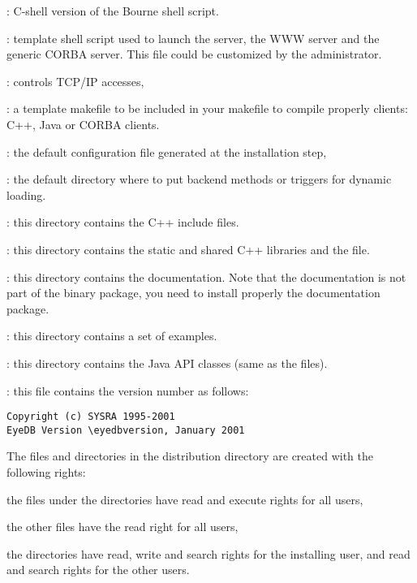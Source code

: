 \item {}: C-shell version of the  Bourne
shell script.
\item {}: template shell script used to launch the \eyedb server,
the \eyedb WWW server and the \eyedb generic CORBA server. This file could
be customized by the \eyedb administrator.
\item {}: controls TCP/IP accesses,
\item {}: a template makefile to be included in your makefile
to compile properly \eyedb clients: C++, Java or CORBA \eyedb clients.
\item {}: the default configuration file generated at the
installation step,
\item {}: the default directory where to put backend methods or
triggers for dynamic loading.
\ei
\item {}: this directory contains the C++ include files.
\item {}: this directory contains the static and shared C++ libraries
and the  file.
\item {}: this directory contains the documentation. Note
that the documentation is not part of the binary package, you need
to install properly the documentation package.
\item {}: this directory contains a set of examples.
\item {}: this directory contains the Java API classes (same
as the  files).
\item {}: this file contains the version number as follows:
\begin{verbatim}
Copyright (c) SYSRA 1995-2001
EyeDB Version \eyedbversion, January 2001
\end{verbatim}
\ei
The files and directories in the distribution directory
are created with the following rights:
\bi
\item the files under the  directories have read and execute
rights for all users,
\item the other files have the read right for all users,
\item the directories have read, write and search rights for the
installing user, and read and search rights for the other users.
\ei
